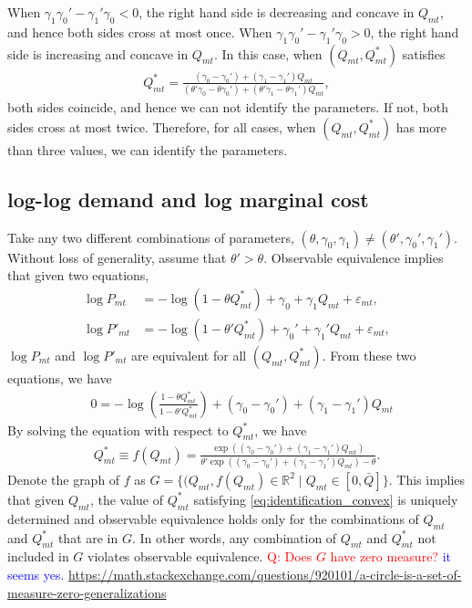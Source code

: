 \documentclass[11pt]{article}
\numberwithin{figure}{section}
\theoremstyle{definition}
\newcommand{\0}{\mathbf{0}}
\begin{document}
When $\gamma_1\gamma_0' - \gamma_1' \gamma_0 < 0$, the right hand side is decreasing and concave in $Q_{mt}$, and hence both sides cross at most once.
When $\gamma_1\gamma_0' - \gamma_1' \gamma_0 >0$, the right hand side is increasing and concave in $Q_{mt}$.
In this case, when $(Q_{mt}, Q^*_{mt})$ satisfies
\begin{align*}
    Q^*_{mt} = \frac{(\gamma_0 - \gamma_0') + (\gamma_1 - \gamma_1')Q_{mt}}{(\theta'\gamma_0 - \theta\gamma_0') + (\theta'\gamma_1 - \theta\gamma_1')Q_{mt}},
\end{align*}
both sides coincide, and hence we can not identify the parameters. If not, both sides cross at most twice.
Therefore, for all cases, when $(Q_{mt}, Q^*_{mt})$ has more than three values, we can identify the parameters.

\subsection{log-log demand and log marginal cost}
    Take any two different combinations of parameters, $(\theta, \gamma_0, \gamma_1) \ne (\theta', \gamma_0', \gamma_1')$. Without loss of generality, assume that $\theta' > \theta$. Observable equivalence implies that given two equations,
    \begin{align}
        \log P_{mt} &= -\log \left(  1 - \theta Q^*_{mt} \right) +\gamma_0 + \gamma_1 Q_{mt} + \varepsilon_{mt},\\
        \log P'_{mt} &= -\log \left(  1 - \theta' Q^*_{mt} \right) +\gamma_0' + \gamma_1' Q_{mt} + \varepsilon_{mt},
    \end{align}
    $\log P_{mt}$ and $\log P'_{mt}$ are equivalent for all $(Q_{mt}, Q^*_{mt})$.
    From these two equations, we have
    \begin{align}\label{eq:identification_convex}
        &0  = -\log \left( \frac{ 1 - \theta Q^*_{mt}}{ 1 - \theta' Q^*_{mt}} \right) +(\gamma_0 -\gamma_0') + (\gamma_1 - \gamma_1') Q_{mt}
    \end{align}
    By solving the equation with respect to $Q^*_{mt}$, we have
    \begin{align*}
        Q^*_{mt} \equiv f(Q_{mt}) = \frac{\exp((\gamma_0 -\gamma_0') + (\gamma_1 - \gamma_1') Q_{mt})}{\theta'\exp((\gamma_0 -\gamma_0') + (\gamma_1 - \gamma_1') Q_{mt}) - \theta }.
    \end{align*}
    Denote the graph of $f$ as $G = \{ (Q_{mt}, f(Q_{mt}) \in \mathbb{R}^2 \mid Q_{mt} \in [0,\bar{Q}] \}$.
    This implies that given $Q_{mt}$, the value of $ Q^*_{mt}$ satisfying \eqref{eq:identification_convex} is uniquely determined and observable equivalence holds only for the combinations of $Q_{mt}$ and $Q^*_{mt}$ that are in $G$. In other words, any combination of $Q_{mt}$ and $Q^*_{mt}$ not included in $G$ violates observable equivalence.
    \textcolor{red}{Q: Does $ G$ have zero measure?} \textcolor{blue}{it seems yes. \url{ https://math.stackexchange.com/questions/920101/a-circle-is-a-set-of-measure-zero-generalizations}}
    
\end{document}

